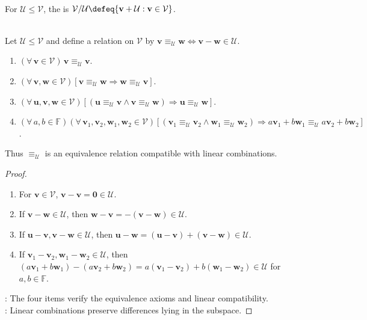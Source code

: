 \begin{definition} \label{def:quotient-space} \\
For $\mathcal{U}\leq\mathcal{V}$, the  is $\mathcal{V}/\mathcal{U}\defeq\{\mathbf{v}+\mathcal{U}:\mathbf{v}\in\mathcal{V}\}$.
\end{definition}

\begin{proposition} \label{prop:quotient-relation-congruence} \\
Let $\mathcal{U}\leq\mathcal{V}$ and define a relation on $\mathcal{V}$ by $\mathbf{v}\equiv_{\mathcal{U}}\mathbf{w}\Longleftrightarrow\mathbf{v}-\mathbf{w}\in\mathcal{U}$.
\begin{enumerate}[label=(\roman*)]
\setlength{\itemsep}{0pt}
\item $(\forall\,\mathbf{v}\in\mathcal{V})\,\mathbf{v}\equiv_{\mathcal{U}}\mathbf{v}$.
\item $(\forall\,\mathbf{v},\mathbf{w}\in\mathcal{V})[\mathbf{v}\equiv_{\mathcal{U}}\mathbf{w}\Rightarrow\mathbf{w}\equiv_{\mathcal{U}}\mathbf{v}]$.
\item $(\forall\,\mathbf{u},\mathbf{v},\mathbf{w}\in\mathcal{V})[(\mathbf{u}\equiv_{\mathcal{U}}\mathbf{v}\land\mathbf{v}\equiv_{\mathcal{U}}\mathbf{w})\Rightarrow\mathbf{u}\equiv_{\mathcal{U}}\mathbf{w}]$.
\item $(\forall\,a,b\in\mathbb{F})(\forall\,\mathbf{v}_1,\mathbf{v}_2,\mathbf{w}_1,\mathbf{w}_2\in\mathcal{V})[(\mathbf{v}_1\equiv_{\mathcal{U}}\mathbf{v}_2\land\mathbf{w}_1\equiv_{\mathcal{U}}\mathbf{w}_2)\Rightarrow a\mathbf{v}_1+b\mathbf{w}_1\equiv_{\mathcal{U}}a\mathbf{v}_2+b\mathbf{w}_2]$.
\end{enumerate}
Thus $\equiv_{\mathcal{U}}$ is an equivalence relation compatible with linear combinations.
\begin{proof}
\begin{enumerate}[label=(\roman*)]
\setlength{\itemsep}{0pt}
\item For $\mathbf{v}\in\mathcal{V}$, $\mathbf{v}-\mathbf{v}=\mathbf{0}\in\mathcal{U}$.
\item If $\mathbf{v}-\mathbf{w}\in\mathcal{U}$, then $\mathbf{w}-\mathbf{v}=-(\mathbf{v}-\mathbf{w})\in\mathcal{U}$.
\item If $\mathbf{u}-\mathbf{v},\mathbf{v}-\mathbf{w}\in\mathcal{U}$, then $\mathbf{u}-\mathbf{w}=(\mathbf{u}-\mathbf{v})+(\mathbf{v}-\mathbf{w})\in\mathcal{U}$.
\item If $\mathbf{v}_1-\mathbf{v}_2,\mathbf{w}_1-\mathbf{w}_2\in\mathcal{U}$, then $(a\mathbf{v}_1+b\mathbf{w}_1)-(a\mathbf{v}_2+b\mathbf{w}_2)=a(\mathbf{v}_1-\mathbf{v}_2)+b(\mathbf{w}_1-\mathbf{w}_2)\in\mathcal{U}$ for $a,b\in\mathbb{F}$.
\end{enumerate}
: The four items verify the equivalence axioms and linear compatibility.\\
: Linear combinations preserve differences lying in the subspace.
\end{proof}
\end{proposition}


